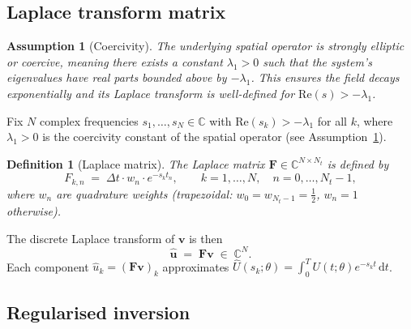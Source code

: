 \documentclass[11pt, a4paper]{article}
\newtheorem{definition}[theorem]{Definition}
\newtheorem{assumption}{Assumption}[section]
\newcommand{\C}{\mathbb{C}}
\begin{document}
\subsection{Laplace transform matrix}

\begin{assumption}[Coercivity]
  \label{ass:coercivity}
  The underlying spatial operator is strongly elliptic or coercive, meaning there exists a constant $\lambda_1 > 0$ such that the system's eigenvalues have real parts bounded above by $-\lambda_1$. This ensures the field decays exponentially and its Laplace transform is well-defined for $\mathrm{Re}(s) > -\lambda_1$.
\end{assumption}

Fix $N$ complex frequencies $s_1,\ldots,s_N \in \C$ with
$\mathrm{Re}(s_k) > -\lambda_1$ for all $k$, where $\lambda_1 > 0$ is the
coercivity constant of the spatial operator (see Assumption~\ref{ass:coercivity}).

\begin{definition}[Laplace matrix]
  The \emph{Laplace matrix} $\mathbf{F} \in \C^{N \times N_t}$ is defined by
  \begin{equation}
    \label{eq:F_def}
    F_{k,n} \;=\; \Delta t \cdot w_n \cdot e^{-s_k t_n},
    \qquad k = 1,\ldots,N,\quad n = 0,\ldots,N_t-1,
  \end{equation}
  where $w_n$ are quadrature weights
  (trapezoidal: $w_0 = w_{N_t-1} = \tfrac{1}{2}$, $w_n = 1$ otherwise).
\end{definition}

The discrete Laplace transform of $\mathbf{v}$ is then
\begin{equation}
  \label{eq:forward}
  \hat{\mathbf{u}} \;=\; \mathbf{F}\mathbf{v} \;\in\; \C^N.
\end{equation}
Each component $\hat{u}_k = (\mathbf{F}\mathbf{v})_k$ approximates
$\hat{U}(s_k;\theta) = \int_0^T U(t;\theta) e^{-s_k t}\,\mathrm{d}t$.

\subsection{Regularised inversion}
\end{document}
